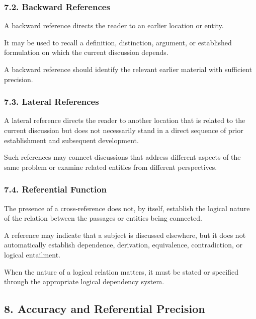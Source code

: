 \subsubsection*{7.2. Backward References}

A backward reference directs the reader
to an earlier location or entity.

It may be used to recall a definition,
distinction, argument, or established
formulation on which the current
discussion depends.

A backward reference should identify
the relevant earlier material with
sufficient precision.

\subsubsection*{7.3. Lateral References}

A lateral reference directs the reader
to another location that is related
to the current discussion but does
not necessarily stand in a direct
sequence of prior establishment
and subsequent development.

Such references may connect discussions
that address different aspects of
the same problem or examine related
entities from different perspectives.

\subsubsection*{7.4. Referential Function}

The presence of a cross-reference
does not, by itself, establish the
logical nature of the relation
between the passages or entities
being connected.

A reference may indicate that
a subject is discussed elsewhere,
but it does not automatically
establish dependence, derivation,
equivalence, contradiction, or
logical entailment.

When the nature of a logical relation
matters, it must be stated or
specified through the appropriate
logical dependency system.


\subsection*{8. Accuracy and Referential Precision}

